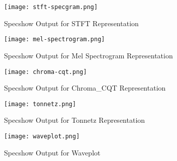 \begin{figure}
  \caption{Specshow Output for STFT Representation}
  \texttt{[image: stft-specgram.png]}
\end{figure}
\begin{figure}
  \caption{Specshow Output for Mel Spectrogram Representation}
  \texttt{[image: mel-spectrogram.png]}
\end{figure}
\begin{figure}
  \caption{Specshow Output for Chroma\_CQT Representation}
  \texttt{[image: chroma-cqt.png]}
\end{figure}
\begin{figure}
  \caption{Specshow Output for Tonnetz Representation}
  \texttt{[image: tonnetz.png]}
\end{figure}
\begin{figure}
  \caption{Specshow Output for Waveplot}
  \texttt{[image: waveplot.png]} 
\end{figure}

